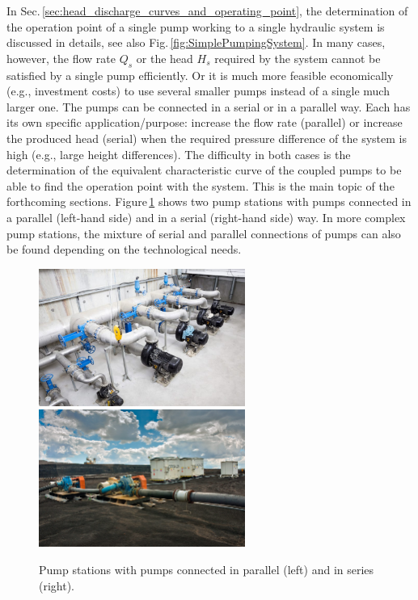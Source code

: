 In Sec.\,\ref{sec:head_discharge_curves_and_operating_point}, the determination of the operation point of a single pump working to a single hydraulic system is discussed in details, see also Fig.\,\ref{fig:SimplePumpingSystem}. In many cases, however, the flow rate $Q_s$ or the head $H_s$ required by the system cannot be satisfied by a single pump efficiently. Or it is much more feasible economically (e.g., investment costs) to use several smaller pumps instead of a single much larger one. The pumps can be connected in a serial or in a parallel way. Each has its own specific application/purpose: increase the flow rate (parallel) or increase the produced head (serial) when the required pressure difference of the system is high (e.g., large height differences). The difficulty in both cases is the determination of the equivalent characteristic curve of the coupled pumps to be able to find the operation point with the system. This is the main topic of the forthcoming sections. Figure\,\ref{fig:pump_stations_examples} shows two pump stations with pumps connected in a parallel (left-hand side) and in a serial (right-hand side) way. In more complex pump stations, the mixture of serial and parallel connections of pumps can also be found depending on the technological needs.

\begin{figure}[ht!]
	\centering
		\includegraphics[height=4.5cm]{Control/Figures/Pump_Station_Parallel_Connection.jpg}
		\includegraphics[height=4.5cm]{Control/Figures/Pump_Station_Serial_Connection.jpg}
	\caption{Pump stations with pumps connected in parallel (left) and in series (right).}
	\label{fig:pump_stations_examples}
\end{figure}


